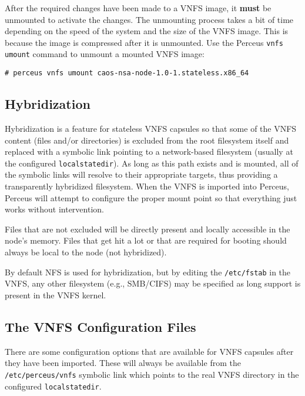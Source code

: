 \documentclass[10pt,letterpaper]{report}
\begin{document}
After the required changes have been made to a VNFS image, it {\bf must} be
unmounted to activate the changes.  The unmounting process takes a bit
of time depending on the speed of the system and the size of the VNFS image.
This is because the image is compressed after it is unmounted.  Use the
Perceus {\tt vnfs umount} command to unmount a mounted VNFS image:

\begin{verbatim}
# perceus vnfs umount caos-nsa-node-1.0-1.stateless.x86_64
\end{verbatim}

\subsection{Hybridization}

Hybridization is a feature for stateless VNFS capsules so that some of the
VNFS content (files and/or directories) is excluded from the root filesystem
itself and replaced with a symbolic link pointing to a network-based
filesystem (usually at the configured {\tt localstatedir}).  As long as this
path exists and is mounted, all of the symbolic links will resolve to their
appropriate targets, thus providing a transparently hybridized filesystem.
When the VNFS is imported into Perceus, Perceus will attempt to configure the
proper mount point so that everything just works without intervention.

Files that are not excluded will be directly present and locally accessible in
the node's memory.  Files that get hit a lot or that are required for booting
should always be local to the node (not hybridized).

By default NFS is used for hybridization, but by editing the {\tt /etc/fstab}
in the VNFS, any other filesystem (e.g., SMB/CIFS) may be specified as long
support is present in the VNFS kernel.

\subsection{The VNFS Configuration Files}

There are some configuration options that are available for VNFS capsules
after they have been imported. These will always be available from the {\tt
/etc/perceus/vnfs} symbolic link which points to the real VNFS directory in
the configured {\tt localstatedir}.
\end{document}
